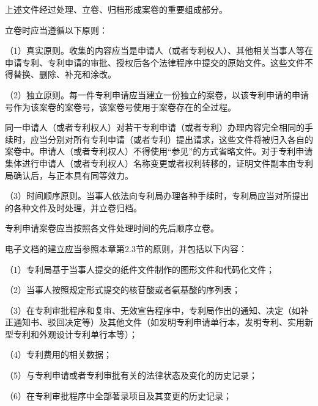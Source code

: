上述文件经过处理、立卷、归档形成案卷的重要组成部分。

立卷时应当遵循以下原则：

{\setlength{\parindent}{17.1bp}（1）真实原则。收集的内容应当是申请人（或者专利权人）、其他相关当事人等在申请专利、专利申请的审批、授权后各个法律程序中提交的原始文件。这些文件不得替换、删除、补充和涂改。\par}

{\setlength{\parindent}{17.1bp}（2）独立原则。每一件专利申请应当建立一份独立的案卷，以该专利申请的申请号作为该案卷的案卷号，该案卷号使用于案卷存在的全过程。\par}

同一申请人（或者专利权人）对若干专利申请（或者专利）办理内容完全相同的手续时，应当分别对所有专利申请（或者专利）提出请求，这些文件将被归入各自的案卷中。申请人（或者专利权人）不得使用“参见”的方式省略文件。对于专利申请集体进行申请人（或者专利权人）名称变更或者权利转移的，证明文件副本由专利局确认后，与正本具有同等效力。

{\setlength{\parindent}{17.1bp}（3）时间顺序原则。当事人依法向专利局办理各种手续时，专利局应当对所提出的各种文件及时处理，并立卷归档。\par}

专利申请案卷应当按照各文件处理时间的先后顺序立卷。

电子文档的建立应当参照本章第2.3节的原则，并包括以下内容：

{\setlength{\parindent}{17.1bp}（1）专利局基于当事人提交的纸件文件制作的图形文件和代码化文件；\par}

{\setlength{\parindent}{17.1bp}（2）当事人按照规定形式提交的核苷酸或者氨基酸的序列表；\par}

{\setlength{\parindent}{17.1bp}（3）在专利审批程序和复审、无效宣告程序中，专利局作出的通知、决定（如补正通知书、驳回决定等）及其他文件（如发明专利申请单行本，发明专利、实用新型专利和外观设计专利单行本等）；\par}

{\setlength{\parindent}{17.1bp}（4）专利费用的相关数据；\par}

{\setlength{\parindent}{17.1bp}（5）与专利申请或者专利审批有关的法律状态及变化的历史记录；\par}

{\setlength{\parindent}{17.1bp}（6）在专利审批程序中全部著录项目及其变更的历史记录；\par}


